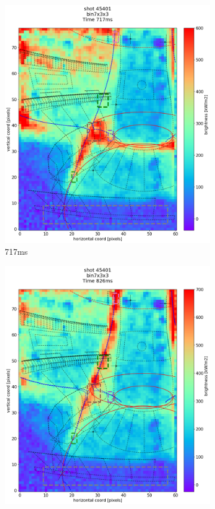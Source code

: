 \begin{figure}
\begin{subfigure}{0.355\linewidth}
         \includegraphics[trim={50 0 25 80},clip,width=\textwidth]{Chapters/chapter2/figs/IRVB-MASTU_shot-45401_export_64.png}
         \caption{717ms}
         \label{fig:45401_export_2}
     \end{subfigure}
     \begin{subfigure}{0.34\linewidth}
         \centering
         \includegraphics[trim={50 25 25 80},clip,width=\textwidth]{Chapters/chapter2/figs/IRVB-MASTU_shot-45401_export_65.png}

\end{subfigure}
\end{figure}

